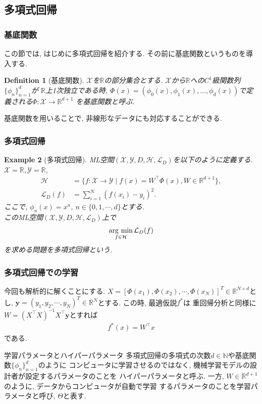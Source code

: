 \documentclass[dvipdfmx,11pt]{beamer}		%
\newtheorem{defi}{Definition}
\newtheorem{exam}[defi]{Example}
\newcommand{\N}{\mathbb{N}}
\newcommand{\R}{\mathbb{R}}
\newcommand{\X}{\mathcal{X}}
\newcommand{\Y}{\mathcal{Y}}
\newcommand{\Hil}{\mathcal{H}}
\newcommand{\Loss}{\mathcal{L}_{D}}
\newcommand{\MLsp}{(\X, \Y, D, \Hil, \Loss)}
\newcommand{\argmin}{\mathop{\rm arg~min}\limits}
\begin{document}
    \subsection{多項式回帰}
    \begin{frame}
        \frametitle{基底関数}
        この節では, はじめに多項式回帰を紹介する. 
        その前に基底関数というものを導入する. 
        \begin{defi}[基底関数]
            $\X$を$\R$の部分集合とする. $\X$から$\R$への$C^1$級関数列$\{\phi_{n}\}_{n = 1}^{d}$が
            $\R$上1次独立である時, $\Phi(x) = (\phi_{0}(x), \phi_{1}(x), \ldots, \phi_{d}(x))$で定義される$\Phi:\X\to\R^{d + 1}$
            を基底関数と呼ぶ. 
        \end{defi}
        基底関数を用いることで, 非線形なデータにも対応することができる. 
    \end{frame}
    \begin{frame}\frametitle{多項式回帰}
        \begin{exam}[多項式回帰]
            ML空間$\MLsp$を以下のように定義する.\\
            $\X = \R, \Y = \R$, 
            \footnotesize
            \begin{align*}
                \Hil &= \{f:\X\to\Y\mid f(x) = W^{\top}\Phi(x), W\in\R^{d + 1}\},\\
                \Loss(f) &= \sum_{i = 1}^{N}(f(x_i) - y_i)^2.
            \end{align*}
            \normalsize
            ここで, $\phi_{n}(x) = x^{n}$, $n\in\{0, 1, \cdots, d\}$とする.\\
            このML空間$\MLsp$上で
            \begin{align*}
                \argmin_{f\in\Hil}\Loss(f)
            \end{align*}
            を求める問題を多項式回帰という. 
        \end{exam}
    \end{frame}
    \begin{frame}
        \frametitle{多項式回帰での学習}
            今回も解析的に解くことにする. $X = [\Phi(x_1), \Phi(x_{2}), \cdots, \Phi(x_N)]^{T}\in\R^{N\times d}$とし, 
            $\mathbf{y} = (y_{1}, y_{2}, \cdots, y_{N})^{T}\in\R^{N}$とする. この時, 最適仮説$f^{*}$は
            重回帰分析と同様に$W = (X^\top X)^{-1}X^\top\mathbf{y}$とすれば
            \begin{align*}
                f^{*}(x) = W^{\top}x
            \end{align*}
            である. 
            \begin{block}{学習パラメータとハイパーパラメータ}
                多項式回帰の多項式の次数$d\in\N$や基底関数$\{\phi_{n}\}_{n = 1}^{d}$のように
                コンピュータに学習させるのではなく, 機械学習モデルの設計者が設定するパラメータのことを
                ハイパーパラメータと呼ぶ. 一方, $W\in\R^{d + 1}$のように, データからコンピュータが自動で学習
                するパラメータのことを学習パラメータと呼び, $\Theta$と表す.
            \end{block}
    \end{frame}
\end{document}
